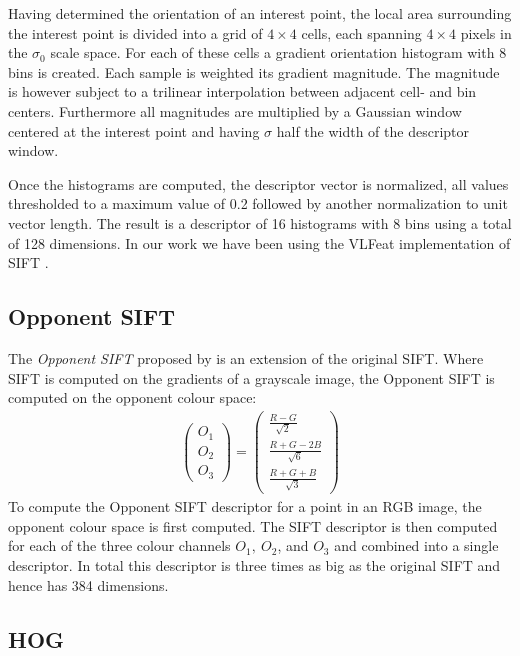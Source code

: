 \documentclass[thesis.tex]{subfiles}
\begin{document}
Having determined the orientation of an interest point, the local area surrounding the interest point is divided into a grid of $4 \times 4$ cells, each spanning $4 \times 4$ pixels in the $\sigma_0$ scale space. For each of these cells a gradient orientation histogram with 8 bins is created. Each sample is weighted its gradient magnitude. The magnitude is however subject to a trilinear interpolation between adjacent cell- and bin centers. Furthermore all magnitudes are multiplied by a Gaussian window centered at the interest point and having $\sigma$ half the width of the descriptor window.

Once the histograms are computed, the descriptor vector is normalized, all values thresholded to a maximum value of 0.2 followed by another normalization to unit vector length.
The result is a descriptor of 16 histograms with 8 bins using a total of 128 dimensions. In our work we have been using the VLFeat implementation of SIFT \cite{vedaldi2008vlfeat}.

\subsection{Opponent SIFT}
\label{sec:opponentColourSpace}

The \emph{Opponent SIFT} proposed by \citet{van2010evaluating} is an extension of the original SIFT. Where SIFT is computed on the gradients of a grayscale image, the Opponent SIFT is computed on the opponent colour space:
\begin{align*}
	\begin{pmatrix} O_1 \\ O_2 \\ O_3 \end{pmatrix} =
		\begin{pmatrix}
			\frac{R-G}{\sqrt{2}} \\
			\frac{R+G-2B}{\sqrt{6}} \\
			\frac{R+G+B}{\sqrt{3}}
		\end{pmatrix}
\end{align*}
To compute the Opponent SIFT descriptor for a point in an RGB image, the opponent colour space is first computed. The SIFT descriptor is then computed for each of the three colour channels $O_1,~O_2$, and $O_3$ and combined into a single descriptor. In total this descriptor is three times as big as the original SIFT and hence has 384 dimensions.


\subsection{HOG}
\end{document}

